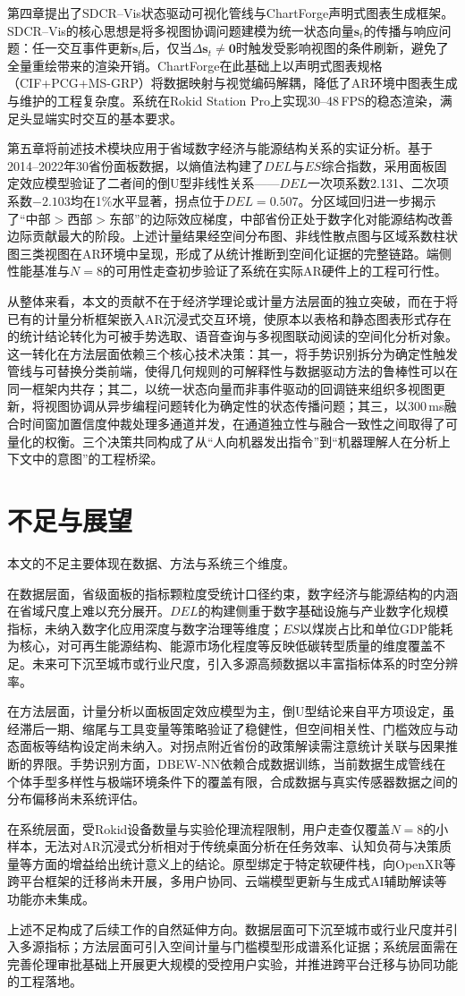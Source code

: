 第四章提出了SDCR--Vis状态驱动可视化管线与ChartForge声明式图表生成框架。SDCR--Vis的核心思想是将多视图协调问题建模为统一状态向量$\mathbf{s}_t$的传播与响应问题：任一交互事件更新$\mathbf{s}_t$后，仅当$\Delta\mathbf{s}_t\neq\mathbf{0}$时触发受影响视图的条件刷新，避免了全量重绘带来的渲染开销。ChartForge在此基础上以声明式图表规格（CIF+PCG+MS-GRP）将数据映射与视觉编码解耦，降低了AR环境中图表生成与维护的工程复杂度。系统在Rokid Station Pro上实现30--48\,FPS的稳态渲染，满足头显端实时交互的基本要求。

第五章将前述技术模块应用于省域数字经济与能源结构关系的实证分析。基于2014--2022年30省份面板数据，以熵值法构建了$DEL$与$ES$综合指数，采用面板固定效应模型验证了二者间的倒U型非线性关系——$DEL$一次项系数2.131、二次项系数$-2.103$均在1\%水平显著，拐点位于$DEL=0.507$。分区域回归进一步揭示了``中部$>$西部$>$东部''的边际效应梯度，中部省份正处于数字化对能源结构改善边际贡献最大的阶段。上述计量结果经空间分布图、非线性散点图与区域系数柱状图三类视图在AR环境中呈现，形成了从统计推断到空间化证据的完整链路。端侧性能基准与$N=8$的可用性走查初步验证了系统在实际AR硬件上的工程可行性。

从整体来看，本文的贡献不在于经济学理论或计量方法层面的独立突破，而在于将已有的计量分析框架嵌入AR沉浸式交互环境，使原本以表格和静态图表形式存在的统计结论转化为可被手势选取、语音查询与多视图联动阅读的空间化分析对象。这一转化在方法层面依赖三个核心技术决策：其一，将手势识别拆分为确定性触发管线与可替换分类前端，使得几何规则的可解释性与数据驱动方法的鲁棒性可以在同一框架内共存；其二，以统一状态向量而非事件驱动的回调链来组织多视图更新，将视图协调从异步编程问题转化为确定性的状态传播问题；其三，以300\,ms融合时间窗加置信度仲裁处理多通道并发，在通道独立性与融合一致性之间取得了可量化的权衡。三个决策共同构成了从``人向机器发出指令''到``机器理解人在分析上下文中的意图''的工程桥梁。

\section{不足与展望}

本文的不足主要体现在数据、方法与系统三个维度。

在数据层面，省级面板的指标颗粒度受统计口径约束，数字经济与能源结构的内涵在省域尺度上难以充分展开。$DEL$的构建侧重于数字基础设施与产业数字化规模指标，未纳入数字化应用深度与数字治理等维度；$ES$以煤炭占比和单位GDP能耗为核心，对可再生能源结构、能源市场化程度等反映低碳转型质量的维度覆盖不足。未来可下沉至城市或行业尺度，引入多源高频数据以丰富指标体系的时空分辨率。

在方法层面，计量分析以面板固定效应模型为主，倒U型结论来自平方项设定，虽经滞后一期、缩尾与工具变量等策略验证了稳健性，但空间相关性、门槛效应与动态面板等结构设定尚未纳入。对拐点附近省份的政策解读需注意统计关联与因果推断的界限。手势识别方面，DBEW-NN依赖合成数据训练，当前数据生成管线在个体手型多样性与极端环境条件下的覆盖有限，合成数据与真实传感器数据之间的分布偏移尚未系统评估。

在系统层面，受Rokid设备数量与实验伦理流程限制，用户走查仅覆盖$N=8$的小样本，无法对AR沉浸式分析相对于传统桌面分析在任务效率、认知负荷与决策质量等方面的增益给出统计意义上的结论。原型绑定于特定软硬件栈，向OpenXR等跨平台框架的迁移尚未开展，多用户协同、云端模型更新与生成式AI辅助解读等功能亦未集成。

上述不足构成了后续工作的自然延伸方向。数据层面可下沉至城市或行业尺度并引入多源指标；方法层面可引入空间计量与门槛模型形成谱系化证据；系统层面需在完善伦理审批基础上开展更大规模的受控用户实验，并推进跨平台迁移与协同功能的工程落地。
